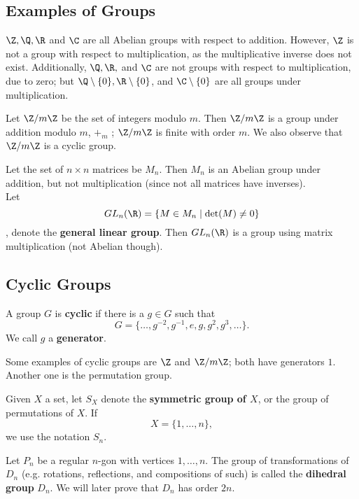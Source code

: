 \documentclass[math1530-lecture-notes]{subfiles}
\begin{document}
\subsection{Examples of Groups}
\begin{example}
  $\Z,\Q,\R$ and $\C$ are all Abelian groups with respect to addition. However, $\Z$ is not a group
  with respect to multiplication, as the multiplicative inverse does not exist. Additionally,
  $\Q,\R,$ and $\C$ are not groups with respect to multiplication, due to zero; but $\Q\setminus \{
  0\}, \R\setminus \{ 0 \}$, and $ \C\setminus \{ 0 \}$ are all groups under multiplication.
\end{example}

\begin{example}
  Let $\Z/m\Z$ be the set of integers modulo $m$. Then  $\Z / m\Z$ is a group under addition
  modulo $m$, $+_m$ ; $\Z / m\Z$ is finite with order $m$. We also observe that $\Z/m\Z$ is a cyclic
  group.
\end{example}

\begin{example}
  Let the set of $n\times n$ matrices be $M_n$. Then  $M_n$ is an Abelian group under addition, but
  not multiplication (since not all matrices have inverses).\\

  Let \[GL_n(\R)=\{M\in M_n\mid \det(M)\neq 0\}\], denote the \textbf{general linear group}. Then
  $GL_n(\R)$ is a group using matrix multiplication (not Abelian though).
\end{example}



\subsection{Cyclic Groups}
\begin{definition}{}
  A group $G$ is \textbf{cyclic} if there is a $g\in G$ such that \[
    G=\{ \ldots,g^{-2},g^{-1} ,e,g,g^2,g^3,\ldots\}
  .\] We call $g$ a \textbf{generator}.
\end{definition}

Some examples of cyclic groups are $\Z$ and $\Z / m\Z$; both have generators $1$. Another one is
the permutation group.
\begin{definition}{}
  Given $X$ a set, let $S_X$ denote the  \textbf{symmetric group of $X$}, or the group of
  permutations of $X$. If  \[
    X=\{ 1,\ldots,n \}
  ,\] we use the notation $S_n$.

  Let $P_n$ be a regular  $n$-gon with vertices $1,\ldots,n$. The group of transformations of $D_n$
  (e.g. rotations, reflections, and compositions of such) is called the  \textbf{dihedral group}
  $D_n$. We will later prove that $D_n$ has order  $2n$.
\end{definition}
\end{document}
